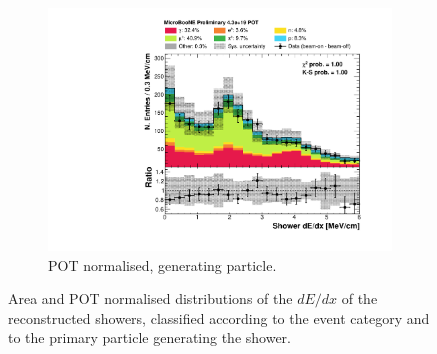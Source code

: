 \begin{figure}[htbp]
\begin{subfigure}{0.49\textwidth}
    \includegraphics[width=\linewidth]{figures/h_shower_dedx_cali_pdg.pdf}
    \caption{POT normalised, generating particle.} \label{fig:dedx_pdg}
  \end{subfigure}
  \caption{Area and POT normalised distributions of the $dE/dx$ of the reconstructed showers, classified according to the event category and to the primary particle generating the shower.}
\end{figure}

